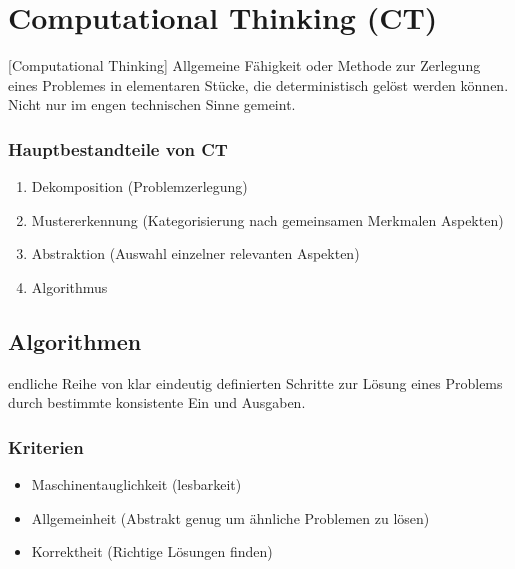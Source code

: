 
\section{Computational Thinking (CT)}

\begin{definition}
    \label{def_ct}
    [Computational Thinking] 
    Allgemeine Fähigkeit oder Methode zur Zerlegung eines Problemes in elementaren Stücke, die deterministisch gelöst werden können. Nicht nur im engen technischen Sinne gemeint. 
\end{definition}

\subsubsection{Hauptbestandteile von CT}
\begin{enumerate}
    \item Dekomposition (Problemzerlegung)
    \item Mustererkennung (Kategorisierung nach gemeinsamen Merkmalen Aspekten)
    \item Abstraktion (Auswahl einzelner relevanten Aspekten)
    \item Algorithmus
\end{enumerate}
\subsection{Algorithmen}
\begin{definition}
    [Algorithmus] endliche Reihe von klar eindeutig definierten Schritte zur Lösung eines Problems durch bestimmte konsistente Ein und Ausgaben.
\end{definition}

\subsubsection{Kriterien}
\begin{itemize}
    \item Maschinentauglichkeit (lesbarkeit)
    \item Allgemeinheit (Abstrakt genug um ähnliche Problemen zu lösen)
    \item Korrektheit (Richtige Lösungen finden)
\end{itemize}

